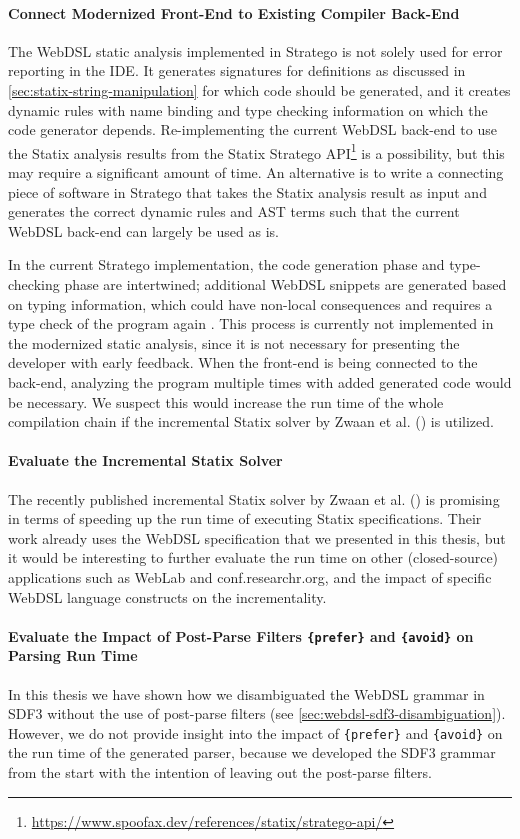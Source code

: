     \paragraph{Connect Modernized Front-End to Existing Compiler Back-End} The WebDSL static analysis implemented in Stratego is not solely used for error reporting in the IDE. It generates signatures for definitions as discussed in \cref{sec:statix-string-manipulation} for which code should be generated, and it creates dynamic rules with name binding and type checking information on which the code generator depends. Re-implementing the current WebDSL back-end to use the Statix analysis results from the Statix Stratego API\footnote{\url{https://www.spoofax.dev/references/statix/stratego-api/}} is a possibility, but this may require a significant amount of time. An alternative is to write a connecting piece of software in Stratego that takes the Statix analysis result as input and generates the correct dynamic rules and AST terms such that the current WebDSL back-end can largely be used as is.

    In the current Stratego implementation, the code generation phase and type-checking phase are intertwined; additional WebDSL snippets are generated based on typing information, which could have non-local consequences and requires a type check of the program again \autocite{HemelKGV10}. This process is currently not implemented in the modernized static analysis, since it is not necessary for presenting the developer with early feedback. When the front-end is being connected to the back-end, analyzing the program multiple times with added generated code would be necessary. We suspect this would increase the run time of the whole compilation chain if the incremental Statix solver by Zwaan et al. (\citeyear{ZwaanAV22}) is utilized.

    \paragraph{Evaluate the Incremental Statix Solver} The recently published incremental Statix solver by Zwaan et al. (\citeyear{ZwaanAV22}) is promising in terms of speeding up the run time of executing Statix specifications. Their work already uses the WebDSL specification that we presented in this thesis, but it would be interesting to further evaluate the run time on other (closed-source) applications such as WebLab and conf.researchr.org, and the impact of specific WebDSL language constructs on the incrementality.

    \paragraph{Evaluate the Impact of Post-Parse Filters \texttt{\{prefer\}} and \texttt{\{avoid\}} on Parsing Run Time} In this thesis we have shown how we disambiguated the WebDSL grammar in SDF3 without the use of post-parse filters (see \cref{sec:webdsl-sdf3-disambiguation}). However, we do not provide insight into the impact of \texttt{\{prefer\}} and \texttt{\{avoid\}} on the run time of the generated parser, because we developed the SDF3 grammar from the start with the intention of leaving out the post-parse filters.
